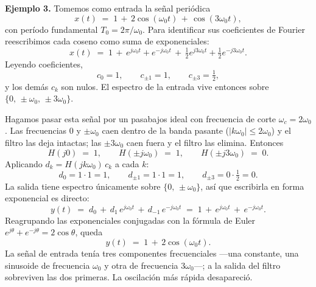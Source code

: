 \documentclass[class=book, crop=false]{standalone}
\begin{document}
\medskip
\textbf{Ejemplo 3.}
Tomemos como entrada la señal periódica
\begin{equation*}
    x(t) \;=\; 1 \,+\, 2\cos(\omega_0 t) \,+\, \cos(3\omega_0 t),
\end{equation*}
con período fundamental $T_0 = 2\pi/\omega_0$. Para identificar sus coeficientes de Fourier reescribimos cada coseno como suma de exponenciales:
\begin{equation*}
    x(t) \;=\; 1 \,+\, e^{j\omega_0 t} + e^{-j\omega_0 t}
            \,+\, \tfrac{1}{2}e^{j3\omega_0 t} + \tfrac{1}{2}e^{-j3\omega_0 t}.
\end{equation*}
Leyendo coeficientes,
\begin{equation*}
    c_0 = 1, \qquad c_{\pm 1} = 1, \qquad c_{\pm 3} = \tfrac{1}{2},
\end{equation*}
y los demás $c_k$ son nulos. El espectro de la entrada vive entonces sobre $\{0,\,\pm\omega_0,\,\pm 3\omega_0\}$.

Hagamos pasar esta señal por un pasabajos ideal con frecuencia de corte $\omega_c = 2\omega_0$. Las frecuencias $0$ y $\pm\omega_0$ caen dentro de la banda pasante ($|k\omega_0| \leq 2\omega_0$) y el filtro las deja intactas; las $\pm 3\omega_0$ caen fuera y el filtro las elimina. Entonces
\begin{equation*}
    H(j0) \;=\; 1, \qquad H(\pm j\omega_0) \;=\; 1, \qquad H(\pm j3\omega_0) \;=\; 0.
\end{equation*}
Aplicando $d_k = H(jk\omega_0)\,c_k$ a cada $k$:
\begin{equation*}
    d_0 = 1\cdot 1 = 1, \qquad
    d_{\pm 1} = 1\cdot 1 = 1, \qquad
    d_{\pm 3} = 0\cdot \tfrac{1}{2} = 0.
\end{equation*}
La salida tiene espectro únicamente sobre $\{0,\,\pm\omega_0\}$, así que escribirla en forma exponencial es directo:
\begin{equation*}
    y(t) \;=\; d_0 \,+\, d_1\,e^{j\omega_0 t} \,+\, d_{-1}\,e^{-j\omega_0 t}
         \;=\; 1 \,+\, e^{j\omega_0 t} \,+\, e^{-j\omega_0 t}.
\end{equation*}
Reagrupando las exponenciales conjugadas con la fórmula de Euler $e^{j\theta} + e^{-j\theta} = 2\cos\theta$, queda
\begin{equation*}
    y(t) \;=\; 1 \,+\, 2\cos(\omega_0 t).
\end{equation*}
La señal de entrada tenía tres componentes frecuenciales ---una constante, una sinusoide de frecuencia $\omega_0$ y otra de frecuencia $3\omega_0$---; a la salida del filtro sobreviven las dos primeras. La oscilación más rápida desapareció.
\end{document}
